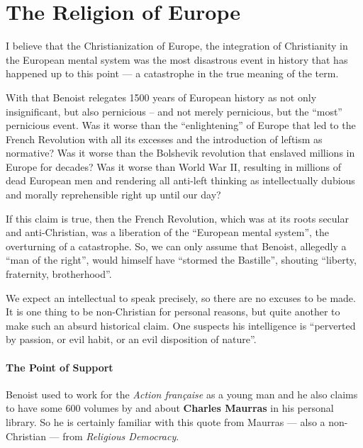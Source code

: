 \section{The Religion of Europe}

\begin{quotex} I believe that the Christianization of Europe, the integration of Christianity in the European mental system was the most disastrous event in history that has happened up to this point --- a catastrophe in the true meaning of the term.
\end{quotex}


With that Benoist relegates 1500 years of European history as not only insignificant, but also pernicious -- and not merely pernicious, but the ``most'' pernicious event. Was it worse than the ``enlightening'' of Europe that led to the French Revolution with all its excesses and the introduction of leftism as normative? Was it worse than the Bolshevik revolution that enslaved millions in Europe for decades? Was it worse than World War II, resulting in millions of dead European men and rendering all anti-left thinking as intellectually dubious and morally reprehensible right up until our day?

If this claim is true, then the French Revolution, which was at its roots secular and anti-Christian, was a liberation of the ``European mental system'', the overturning of a catastrophe. So, we can only assume that Benoist, allegedly a ``man of the right'', would himself have ``stormed the Bastille'', shouting ``liberty, fraternity, brotherhood''.

We expect an intellectual to speak precisely, so there are no excuses to be made. It is one thing to be non-Christian for personal reasons, but quite another to make such an absurd historical claim. One suspects his intelligence is ``perverted by passion, or evil habit, or an evil disposition of nature''.

\paragraph{The Point of Support}


Benoist used to work for the \emph{Action française} as a young man and he also claims to have some 600 volumes by and about \textbf{Charles Maurras} in his personal library. So he is certainly familiar with this quote from Maurras --- also a non-Christian --- from \emph{Religious Democracy}.

